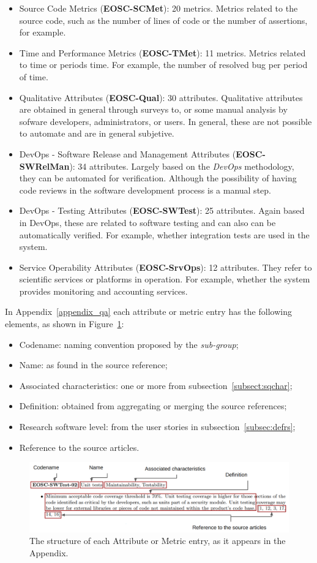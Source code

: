 \begin{itemize}
    \item Source Code Metrics (\textbf{EOSC-SCMet}): 20 metrics. Metrics related to the source code, such as the number of lines of code or the number of assertions, for example.

    \item Time and Performance Metrics (\textbf{EOSC-TMet}): 11 metrics. Metrics related to time or periods time. For example, the number of resolved bug per period of time.

    \item Qualitative Attributes (\textbf{EOSC-Qual}): 30 attributes. Qualitative attributes are obtained in general through surveys to, or some manual analysis by sofware developers, administrators, or users. In general, these are not possible to automate and are in general subjetive.

    \item DevOps - Software Release and Management Attributes (\textbf{EOSC-SWRelMan}): 34 attributes. Largely based on the \textit{DevOps} methodology, they can be automated for verification. Although the possibility of having code reviews in the software development process is a manual step.

    \item DevOps - Testing Attributes (\textbf{EOSC-SWTest}): 25 attributes. Again based in DevOps, these are related to software testing and can also can be automatically verified. For example, whether integration tests are used in the system.

    \item Service Operability Attributes (\textbf{EOSC-SrvOps}): 12 attributes. They refer to scientific services or platforms in operation. For example, whether the system provides monitoring and accounting services.
\end{itemize}

In Appendix~\ref{appendix_qa} each attribute or metric entry has the following elements, as shown in Figure~\ref{fig:sqattr}:

\begin{itemize}
    \item Codename: naming convention proposed by the \textit{sub-group};
    \item Name: as found in the source reference;
    \item Associated characteristics: one or more from subsection~\ref{subsect:sqchar};
    \item Definition: obtained from aggregating or merging the source references;
    \item Research software level: from the user stories in subsection~\ref{subsec:defrs};
    \item Reference to the source articles.
\end{itemize}

\begin{figure}[h]
    \centering
    \includegraphics[width=0.99\linewidth]{imgs/qa.png}
    \caption{The structure of each Attribute or Metric entry, as it appears in the Appendix.}
    \label{fig:sqattr}
\end{figure}
